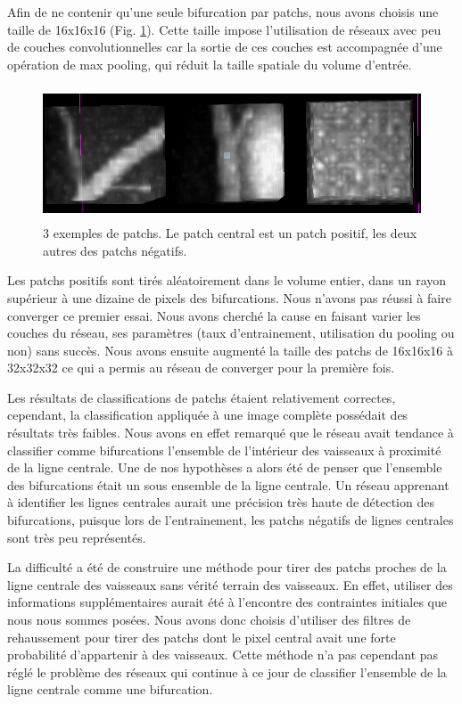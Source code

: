 Afin de ne contenir qu'une seule bifurcation par patchs, nous avons choisis une taille de 16x16x16 (Fig. \ref{fig:exp_patchs}). Cette taille impose l'utilisation de réseaux avec peu de couches convolutionnelles car la sortie de ces couches est accompagnée d'une opération de max pooling, qui réduit la taille spatiale du volume d'entrée. 

\begin{figure}[ht]
    \centering
    \includegraphics[height=4cm]{Images/exp_patchs_exemple.png}
    \caption{3 exemples de patchs. Le patch central est un patch positif, les deux autres des patchs négatifs.}
    \label{fig:exp_patchs}
\end{figure}

Les patchs positifs sont tirés aléatoirement dans le volume entier, dans un rayon supérieur à une dizaine de pixels des bifurcations. Nous n'avons pas réussi à faire converger ce premier essai. Nous avons cherché la cause en faisant varier les couches du réseau, ses paramètres (taux d'entrainement, utilisation du pooling ou non) sans succès. Nous avons ensuite augmenté la taille des patchs de 16x16x16 à 32x32x32 ce qui a permis au réseau de converger pour la première fois.

Les résultats de classifications de patchs étaient relativement correctes, cependant, la classification appliquée à une image complète possédait des résultats très faibles. Nous avons en effet remarqué que le réseau avait tendance à classifier comme bifurcations l'ensemble de l'intérieur des vaisseaux à proximité de la ligne centrale. Une de nos hypothèses a alors été de penser que l'ensemble des bifurcations était un sous ensemble de la ligne centrale. Un réseau apprenant à identifier les lignes centrales aurait une précision très haute de détection des bifurcations, puisque lors de l'entrainement, les patchs négatifs de lignes centrales sont très peu représentés. 

La difficulté a été de construire une méthode pour tirer des patchs proches de la ligne centrale des vaisseaux sans vérité terrain des vaisseaux. En effet, utiliser des informations supplémentaires aurait été à l'encontre des contraintes initiales que nous nous sommes posées. Nous avons donc choisis d'utiliser des filtres de rehaussement pour tirer des patchs dont le pixel central avait une forte probabilité d'appartenir à des vaisseaux. Cette méthode n'a pas cependant pas réglé le problème des réseaux qui continue à ce jour de classifier l'ensemble de la ligne centrale comme une bifurcation.

